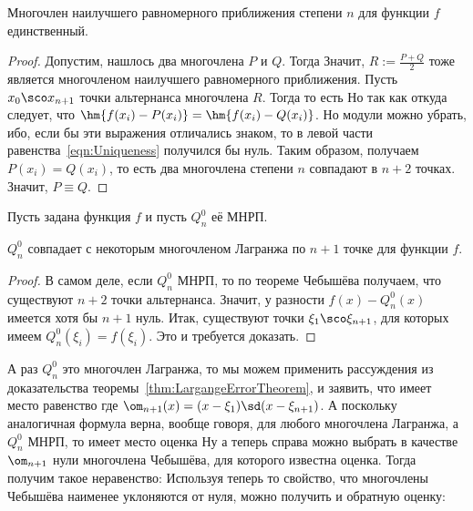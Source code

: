\documentclass[a4paper]{article}
\begin{document}
\begin{theorem}
Многочлен наилучшего равномерного приближения степени $n$ для функции
$f$ единственный.
\end{theorem}
\begin{proof}
Допустим, нашлось два многочлена $P$ и $Q$. Тогда 
Значит, $R := \frac{P+Q}{2}$ тоже является многочленом наилучшего
равномерного приближения.  Пусть $x_0\sco x_{n+1}$ точки альтернанса
многочлена $R$. Тогда  то есть  Но так как
 откуда следует, что
$\hm{f(x_i) - P(x_i)} = \hm{f(x_i) - Q(x_i)}$. Но модули можно убрать,
ибо, если бы эти выражения отличались знаком, то в левой части
равенства~\eqref{eqn:Uniqueness} получился бы нуль.  Таким образом,
получаем $P(x_i) = Q(x_i)$, то есть два многочлена степени $n$
совпадают в $n+2$ точках.  Значит, $P\equiv Q$.
\end{proof}

Пусть задана функция $f$ и пусть $Q_n^0$ её МНРП.

\begin{stm}
$Q_n^0$ совпадает с некоторым многочленом Лагранжа по $n+1$ точке для
  функции $f$.
\end{stm}
\begin{proof}
В самом деле, если $Q_n^0$ МНРП, то по теореме Чебышёва получаем, что
существуют $n+2$ точки альтернанса. Значит, у разности $f(x) -
Q_n^0(x)$ имеется хотя бы $n+1$ нуль.  Итак, существуют точки
$\xi_1\sco\xi_{n+1}$, для которых имеем $Q_n^0(\xi_i) = f(\xi_i)$.
Это и требуется доказать.
\end{proof}

А раз $Q_n^0$ это многочлен Лагранжа, то мы можем применить
рассуждения из доказательства теоремы~\ref{thm:LargangeErrorTheorem},
и заявить, что имеет место равенство  где $\om_{n+1}(x) =
(x-\xi_1)\sd(x-\xi_{n+1})$.  А поскольку аналогичная формула верна,
вообще говоря, для любого многочлена Лагранжа, а $Q_n^0$ МНРП, то
имеет место оценка 
Ну а теперь справа можно выбрать в качестве $\om_{n+1}$ нули
многочлена Чебышёва, для которого известна оценка. Тогда получим такое
неравенство:   Используя теперь то свойство, что
многочлены Чебышёва наименее уклоняются от нуля, можно получить и
обратную оценку: 
\end{document}
